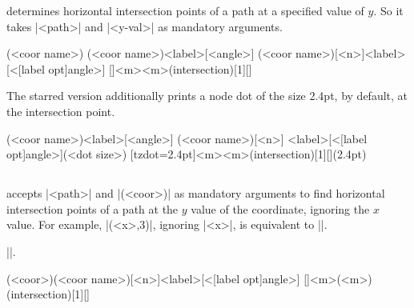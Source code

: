 \icmd{\tzhXpointat} determines horizontal intersection points of a path at a specified value of $y$.
So it takes |{<path>}| and |{<y-val>}| as mandatory arguments.

\begin{tzdef}{}
(<coor name>)
(<coor name>){<label>}[<angle>]
(<coor name>)[<n>]{<label>}[<[label opt]angle>]
  []{<m>}{<m>}(intersection)[1]{}[]
\end{tzdef}


The starred version \icmd{\tzhXpointat*} additionally prints a node dot of the size 2.4pt, by default, at the intersection point.

\begin{tzdef}{}
(<coor name>){<label>}[<angle>]
(<coor name>)[<n>]
             {<label>}[<[label opt]angle>](<dot size>)
  [tzdot=2.4pt]{<m>}{<m>}(intersection)[1]{}[](2.4pt)
\end{tzdef}

\begin{tzcode}{.3}
\end{tzcode}

\subsection{\protect\cmd{\tzhXpoint(*)}}
\label{ss:tzhXpoint}

\icmd{\tzhXpoint} accepts |{<path>}| and |(<coor>)| as mandatory arguments to find horizontal intersection points of a path at the $y$ value of the coordinate, ignoring the $x$ value.
For example, |(<x>,3)|, ignoring |<x>|, is equivalent to ||.

 |\tzhXpointat|.

\begin{tzdef}{}
(<coor>)(<coor name>)[<n>]{<label>}[<[label opt]angle>]
  []{<m>}(<m>)(intersection)[1]{}[]
\end{tzdef}

